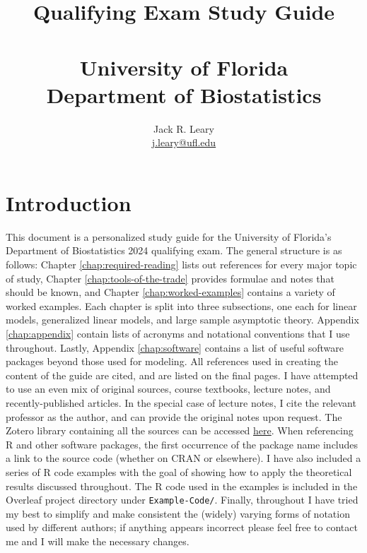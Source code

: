 \documentclass{report}
\title{\Huge \textbf{Qualifying Exam Study Guide} \\ ~ \\ \large University of Florida \\ Department of Biostatistics}
\author{Jack R. Leary \\ \href{mailto:j.leary@ufl.edu}{j.leary@ufl.edu}}
\begin{document}

\maketitle

\chapter*{Introduction}

This document is a personalized study guide for the University of Florida's Department of Biostatistics 2024 qualifying exam. The general structure is as follows: Chapter \ref{chap:required-reading} lists out references for every major topic of study, Chapter \ref{chap:tools-of-the-trade} provides formulae and notes that should be known, and Chapter \ref{chap:worked-examples} contains a variety of worked examples. Each chapter is split into three subsections, one each for linear models, generalized linear models, and large sample asymptotic theory. Appendix \ref{chap:appendix} contain lists of acronyms and notational conventions that I use throughout. Lastly, Appendix \ref{chap:software} contains a list of useful software packages beyond those used for modeling. All references used in creating the content of the guide are cited, and are listed on the final pages. I have attempted to use an even mix of original sources, course textbooks, lecture notes, and recently-published articles. In the special case of lecture notes, I cite the relevant professor as the author, and can provide the original notes upon request. The Zotero library containing all the sources can be accessed \href{https://www.zotero.org/groups/5529617/qualifying-exam/library}{here}. When referencing R and other software packages, the first occurrence of the package name includes a link to the source code (whether on CRAN or elsewhere). I have also included a series of R code examples with the goal of showing how to apply the theoretical results discussed throughout. The R code used in the examples is included in the Overleaf project directory under \texttt{Example-Code/}. Finally, throughout I have tried my best to simplify and make consistent the (widely) varying forms of notation used by different authors; if anything appears incorrect please feel free to contact me and I will make the necessary changes. 

\tableofcontents
\end{document}
